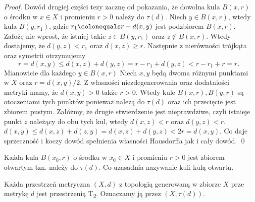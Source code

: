 {\begin{proof}
        Dowód drugiej części tezy zacznę od pokazania, że dowolna kula $B(x, r)$ o środku w $x\in X$ i promieniu $r>0$ należy do $\tau(d).$ Niech $y\in B(x, r)$, wtedy kula $B(y, r_1)$, gdzie $r_1 \colonequals r - d(x, y)$ jest podzbiorem $B(x, r)$. Założę nie wprost, że istniej takie $z\in B(y, r_1)$ oraz $z\notin B(x, r)$. Wtedy dostajemy, że $d(y, z) < r_1$ oraz $d(x, z)\geq r$. Następnie z nierówności trójkąta oraz symetrii otrzymujemy 
        $$r = d(x, y) \leq d(x, z) + d(y, z) = r - r_1 + d(y, z) < r - r_1 + r = r.$$
        Mianowicie dla każdego $y\in B(x, r)$  Niech $x, y$ będą dwoma różnymi punktami w $X$ oraz $r = d(x, y)/2$. Z własności niezdegenerowania oraz dodatniości metryki mamy, że $d(x, y) >0$ także $r> 0$. Wtedy kule $B(x, r), B(y, r)$ są otoczeniami tych punktów ponieważ należą do $\tau(d)$ oraz ich przecięcie jest zbiorem pustym. Załóżmy, że drugie stwierdzenie jest nieprawdziwe, czyli istnieje punkt $z$ należący do obu tych kul, wtedy $d(x, z) < r$ oraz $d(y, z) < r$. $d(x, y) \leq d(x, z) + d(z, y) = d(x, z) + d(y, z) < 2r = d(x, y).$ Co daje sprzeczność i koczy dowód spełnienia własności Hausdorffa jak i cały dowód. \qed
    \end{proof}
    \begin{thmcoro}
        Każda kula $B(x_0, r)$ o środku w $x_0\in X$ i promieniu $r>0$ jest zbiorem otwartym tzn. należy do $\tau(d).$ Co uzasadnia nazywanie kuli kulą otwartą.
    \end{thmcoro}
    \begin{thmcoro}
        Każda przestrzeń metryczna $(X, d)$ z topologią generowaną w zbiorze $X$ prze metrykę $d$ jest przestrzenią T\textsubscript{2}. Oznaczamy ją przez $(X, \tau(d))$.
    \end{thmcoro}
}